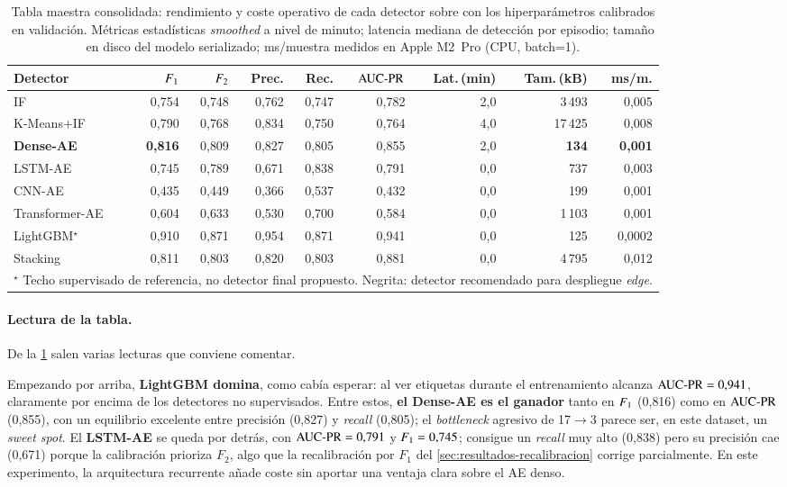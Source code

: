 \begin{table}[H]
\centering
\caption{Tabla maestra consolidada: rendimiento y coste operativo de cada detector sobre  con los hiperparámetros calibrados en validación. Métricas estadísticas \emph{smoothed} a nivel de minuto; latencia mediana de detección por episodio; tamaño en disco del modelo serializado; ms/muestra medidos en Apple M2~Pro (CPU, batch=1).}
\label{tab:master}
\scriptsize
\begin{tabularx}{\textwidth}{X r r r r r r r r}
\toprule
Detector & $F_{1}$ & $F_{2}$ & Prec. & Rec. & $\text{AUC-PR}$ & Lat.\,(min) & Tam.\,(kB) & ms/m.\\
\midrule
IF                 & 0{,}754 & 0{,}748 & 0{,}762 & 0{,}747 & 0{,}782 & 2{,}0 &  3\,493 & 0{,}005 \\
K-Means+IF         & 0{,}790 & 0{,}768 & 0{,}834 & 0{,}750 & 0{,}764 & 4{,}0 & 17\,425 & 0{,}008 \\
\textbf{Dense-AE}  & \textbf{0{,}816} & 0{,}809 & 0{,}827 & 0{,}805 & 0{,}855 & 2{,}0 & \textbf{134} & \textbf{0{,}001} \\
LSTM-AE            & 0{,}745 & 0{,}789 & 0{,}671 & 0{,}838 & 0{,}791 & 0{,}0 &    737 & 0{,}003 \\
CNN-AE             & 0{,}435 & 0{,}449 & 0{,}366 & 0{,}537 & 0{,}432 & 0{,}0 &    199 & 0{,}001 \\
Transformer-AE     & 0{,}604 & 0{,}633 & 0{,}530 & 0{,}700 & 0{,}584 & 0{,}0 &  1\,103 & 0{,}001 \\
LightGBM$^\star$   & 0{,}910 & 0{,}871 & 0{,}954 & 0{,}871 & 0{,}941 & 0{,}0 &    125 & 0{,}0002 \\
Stacking           & 0{,}811 & 0{,}803 & 0{,}820 & 0{,}803 & 0{,}881 & 0{,}0 &  4\,795 & 0{,}012 \\
\bottomrule
\multicolumn{9}{l}{\footnotesize $^\star$ Techo supervisado de referencia, no detector final propuesto. Negrita: detector recomendado para despliegue \textit{edge}.}
\end{tabularx}
\end{table}

\paragraph{Lectura de la tabla.} De la \cref{tab:master} salen varias lecturas que conviene comentar.

Empezando por arriba, \textbf{LightGBM domina}, como cabía esperar: al ver etiquetas durante el entrenamiento alcanza $\text{AUC-PR}=0{,}941$, claramente por encima de los detectores no supervisados. Entre estos, \textbf{el Dense-AE es el ganador} tanto en $F_{1}$ (0{,}816) como en $\text{AUC-PR}$ (0{,}855), con un equilibrio excelente entre precisión (0{,}827) y \textit{recall} (0{,}805); el \textit{bottleneck} agresivo de 17$\to$3 parece ser, en este dataset, un \textit{sweet spot}. El \textbf{LSTM-AE} se queda por detrás, con $\text{AUC-PR}=0{,}791$ y $F_{1}=0{,}745$; consigue un \textit{recall} muy alto (0{,}838) pero su precisión cae (0{,}671) porque la calibración prioriza $F_2$, algo que la recalibración por $F_1$ del \cref{sec:resultados-recalibracion} corrige parcialmente. En este experimento, la arquitectura recurrente añade coste sin aportar una ventaja clara sobre el AE denso.


